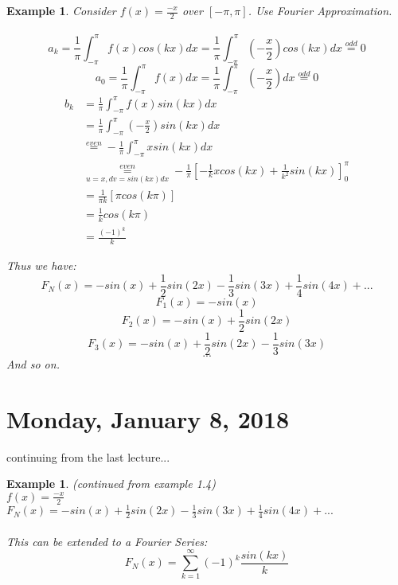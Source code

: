 \documentclass[12pt]{article}
\theoremstyle{plain}
\newtheorem{example}[theorem]{Example}
\theoremstyle{definition}
\begin{document}
\begin{example}
	Consider $f(x)=\frac{-x}{2}$ over $[-\pi, \pi]$. Use Fourier Approximation.\\
	\\
	$$a_k = \frac{1}{\pi} \int^{\pi}_{-\pi} f(x) cos(kx) dx = \frac{1}{\pi} \int^{\pi}_{-\pi} (-\frac{x}{2}) cos(kx) dx \overset{odd}{=} 0$$
	$$a_0 = \frac{1}{\pi} \int^{\pi}_{-\pi} f(x) dx = \frac{1}{\pi} \int^{\pi}_{-\pi} (-\frac{x}{2}) dx \overset{odd}{=} 0$$
	\begin{align*}
		b_k &= \frac{1}{\pi} \int^{\pi}_{-\pi} f(x) sin(kx) dx\\
		&= \frac{1}{\pi} \int^{\pi}_{-\pi} (-\frac{x}{2}) sin(kx) dx\\
		&\overset{even}{=} - \frac{1}{\pi} \int^{\pi}_{-\pi}  x sin(kx) dx\\
		&\underset{u=x, dv=sin(kx)dx}{\overset{even}{=}} - \frac{1}{\pi} [-\frac{1}{k} x cos(kx) + \frac{1}{k^2} sin(kx)]^\pi_0\\
		&= \frac{1}{\pi k} [\pi cos(k\pi)]\\
		&= \frac{1}{k} cos(k\pi)\\
		&= \frac{(-1)^k}{k}
	\end{align*}

	Thus we have:
	$$F_N (x) = -sin(x) + \frac{1}{2}sin(2x) - \frac{1}{3}sin(3x) + \frac{1}{4}sin(4x) + ...$$
	$$F_1 (x) = -sin(x)$$
	$$F_2 (x) = -sin(x) + \frac{1}{2}sin(2x)$$
	$$F_3 (x) = -sin(x) + \frac{1}{2}sin(2x) - \frac{1}{3}sin(3x)$$
	$$...$$
	And so on.

\end{example}

\newpage

\section{Monday, January 8, 2018}

continuing from the last lecture...

\begin{example}
    (continued from example 1.4)\\
    $f(x) = \frac{-x}{2}$\\
    $F_N (x) = -sin(x) + \frac{1}{2}sin(2x) - \frac{1}{3}sin(3x) + \frac{1}{4}sin(4x) + ...$\\
    \\
    This can be extended to a Fourier Series:
    $$F_N (x) = \sum^\infty_{k=1} (-1)^k \frac{sin(kx)}{k}$$
\end{example}
\end{document}
